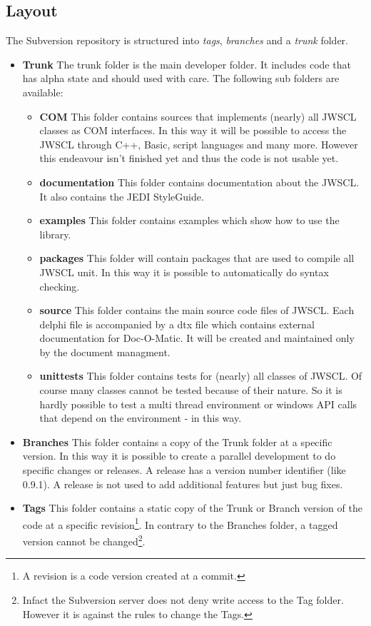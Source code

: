 \documentclass[a4paper,oneside,10pt]{article}
\begin{document}
\subsection{Layout}
The Subversion repository is structured into \textit{tags}, \textit{branches} and a \textit{trunk} folder.
\begin{itemize}
	\item \textbf{Trunk} The trunk folder is the main developer folder. It includes code that has alpha state and should used with care. The following sub folders are available:
	  
		\begin{itemize}
			\item \textbf{COM} This folder contains sources that implements (nearly) all JWSCL classes as COM interfaces. In this way it will be possible to access the JWSCL through C++, Basic, script languages and many more. However this endeavour isn't finished yet and thus the code is not usable yet.
			\item \textbf{documentation} This folder contains documentation about the JWSCL. It also contains the JEDI StyleGuide.
			\item \textbf{examples} This folder contains examples which show how to use the library. 
			\item \textbf{packages} This folder will contain packages that are used to compile all JWSCL unit. In this way it is possible to automatically do syntax checking.
			\item \textbf{source} This folder contains the main source code files of JWSCL. Each delphi file is accompanied by a dtx file which contains external documentation for Doc-O-Matic. It will be created and maintained only by the document managment.
			\item \textbf{unittests} This folder contains tests for (nearly) all classes of JWSCL. Of course many classes cannot be tested because of their nature. So it is hardly possible to test a multi thread environment or windows API calls that depend on the environment - in this way.
		\end{itemize}
	\item \textbf{Branches} This folder contains a copy of the Trunk folder at a specific version. In this way it is possible to create a parallel development to do specific changes or releases. A release has a version number identifier (like 0.9.1). A release is not used to add additional features but just bug fixes. 
	\item \textbf{Tags} This folder contains a static copy of the Trunk or Branch version of the code at a specific revision\footnote{A revision is a code version created at a commit.}. In contrary to the Branches folder, a tagged version cannot be changed\footnote{Infact the Subversion server does not deny write access to the Tag folder. However it is against the rules to change the Tags.}. 
\end{itemize}
\end{document}
